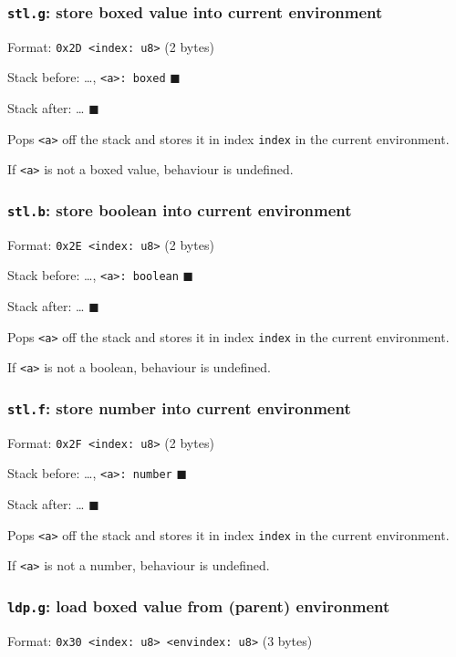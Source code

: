 \subsubsection{\texttt{stl.g}: store boxed value into current environment}
\label{sec:org466d475}
Format: \texttt{0x2D <index: u8>} (2 bytes)

Stack before: \ldots{}, \texttt{<a>: boxed} \(\blacksquare\)

Stack after: \ldots{} \(\blacksquare\)

Pops \texttt{<a>} off the stack and stores it in index \texttt{index} in the current
environment.

If \texttt{<a>} is not a boxed value, behaviour is undefined.

\subsubsection{\texttt{stl.b}: store boolean into current environment}
\label{sec:org711619f}
Format: \texttt{0x2E <index: u8>} (2 bytes)

Stack before: \ldots{}, \texttt{<a>: boolean} \(\blacksquare\)

Stack after: \ldots{} \(\blacksquare\)

Pops \texttt{<a>} off the stack and stores it in index \texttt{index} in the current
environment.

If \texttt{<a>} is not a boolean, behaviour is undefined.

\subsubsection{\texttt{stl.f}: store number into current environment}
\label{sec:org29b23b4}
Format: \texttt{0x2F <index: u8>} (2 bytes)

Stack before: \ldots{}, \texttt{<a>: number} \(\blacksquare\)

Stack after: \ldots{} \(\blacksquare\)

Pops \texttt{<a>} off the stack and stores it in index \texttt{index} in the current
environment.

If \texttt{<a>} is not a number, behaviour is undefined.

\subsubsection{\texttt{ldp.g}: load boxed value from (parent) environment}
\label{sec:org445285b}
Format: \texttt{0x30 <index: u8> <envindex: u8>} (3 bytes)

